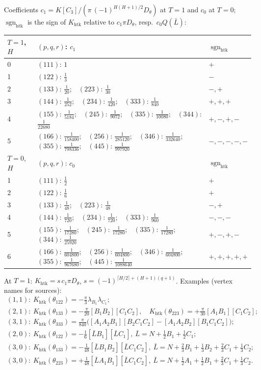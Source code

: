 \documentclass[10pt,a4paper]{article}
\numberwithin{equation}{section}
\theoremstyle{definition}
\theoremstyle{remark}
\newcommand{\sgn}{\operatorname{sgn}}
\newcommand{\htk}{\mathrm{htk}}
\begin{document}
Coefficients $c_1=K[C_3]/(\pi\,(-1)^{H(H+1)/2}D_\theta)$ at $T=1$ and $c_0$ at $T=0$; $\sgn_\htk$ is the sign of $K_\htk$ relative to $c_1\pi D_\theta$, resp.\ $c_0Q(\bar L)$:
{\small
\begin{longtable}{@{}l>{\raggedright\arraybackslash}p{11.2cm}l@{}}
\toprule
$T=1$, $H$ & $(p,q,r)$: $c_1$ & $\sgn_\htk$\\
\midrule
0 & $(111)$: $1$ & $+$\\
1 & $(122)$: $\frac13$ & $-$\\
2 & $(133)$: $\frac1{20}$;\ \ $(223)$: $\frac1{30}$ & $-,+$\\
3 & $(144)$: $\frac1{252}$;\ \ $(234)$: $\frac1{420}$;\ \ $(333)$: $\frac1{840}$ & $+,+,+$\\
4 & $(155)$: $\frac1{5184}$;\ \ $(245)$: $\frac1{9072}$;\ \ $(335)$: $\frac1{10080}$;\ \ $(344)$: $\frac1{22680}$ & $+,-,+,-$\\
5 & $(166)$: $\frac1{158400}$;\ \ $(256)$: $\frac1{285120}$;\ \ $(346)$: $\frac1{332640}$;\ \ $(355)$: $\frac1{798336}$;\ \ $(445)$: $\frac1{997920}$ & $-,-,-,-,-$\\
\midrule
$T=0$, $H$ & $(p,q,r)$: $c_0$ & $\sgn_\htk$\\
\midrule
1 & $(111)$: $\frac12$ & $+$\\
2 & $(122)$: $\frac16$ & $+$\\
3 & $(133)$: $\frac1{48}$;\ \ $(223)$: $\frac1{48}$ & $-,+$\\
4 & $(144)$: $\frac1{720}$;\ \ $(234)$: $\frac1{720}$;\ \ $(333)$: $\frac1{960}$ & $-,-,-$\\
5 & $(155)$: $\frac1{17280}$;\ \ $(245)$: $\frac1{17280}$;\ \ $(335)$: $\frac1{17280}$;\ \ $(344)$: $\frac1{25920}$ & $+,-,+,-$\\
6 & $(166)$: $\frac1{604800}$;\ \ $(256)$: $\frac1{604800}$;\ \ $(346)$: $\frac1{604800}$;\ \ $(355)$: $\frac1{967680}$;\ \ $(445)$: $\frac1{1088640}$ & $+,+,+,+,+$\\
\bottomrule
\end{longtable}}
At $T=1$: $K_\htk=s\,c_1\pi D_\theta$, $s=(-1)^{\lceil H/2\rceil+(H+1)(q+1)}$. Examples (vertex names for sources):
\begin{gather}
(1,1):\ K_\htk(\theta_{122})=-\tfrac\pi3\lambda_{B_1}\lambda_{C_1};\\
(2,1):\ K_\htk(\theta_{133})=-\tfrac\pi{20}[B_1B_2][C_1C_2],\quad K_\htk(\theta_{223})=+\tfrac\pi{30}[A_1B_1][C_1C_2];\\
(3,1):\ K_\htk(\theta_{333})=\tfrac{\pi}{840}\big([A_1A_2B_1][B_2C_1C_2]-[A_1A_2B_2][B_1C_1C_2]\big);\\
(2,0):\ K_\htk(\theta_{122})=-\tfrac16[\bar LB_1][\bar LC_1],\ \bar L=N+\tfrac12B_1+\tfrac12C_1;\\
(3,0):\ K_\htk(\theta_{133})=-\tfrac1{48}[\bar LB_1B_2][\bar LC_1C_2],\ \bar L=N+\tfrac23B_1+\tfrac13B_2+\tfrac23C_1+\tfrac13C_2;\\
(3,0):\ K_\htk(\theta_{223})=+\tfrac1{48}[\bar LA_1B_1][\bar LC_1C_2],\ \bar L=N+\tfrac12A_1+\tfrac12B_1+\tfrac23C_1+\tfrac13C_2 .
\end{gather}
\end{document}
